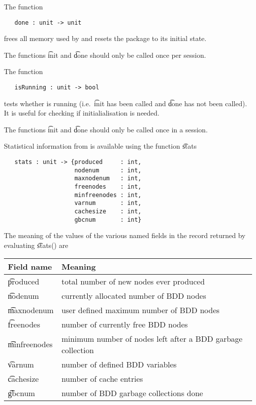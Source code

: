 The function

\begin{verbatim}
   done : unit -> unit
\end{verbatim}

frees all memory used by \Buddy{} and resets the
package to its initial state. 

The functions \t{init} and \t{done} should only be called once per session.

The function

\begin{verbatim}
   isRunning : unit -> bool
\end{verbatim}

tests whether
\Buddy{} is running (i.e.~\t{init} has been called and \t{done} has not been called). It is
useful for checking if initialialisation is needed.

The functions \t{init} and \t{done} should only be called once in a session.

Statistical information from \Buddy{} is available
using the function \t{stats}

\begin{verbatim}
   stats : unit -> {produced     : int,
                    nodenum      : int,
                    maxnodenum   : int,
                    freenodes    : int,
                    minfreenodes : int,
                    varnum       : int,
                    cachesize    : int,
                    gbcnum       : int}
\end{verbatim}

The meaning of the values of the various named fields in the record returned by
evaluating \t{stats()} are

\medskip

\begin{tabular}{|l|l|} \hline
{\bf{Field name}}& {\bf{Meaning}}                                              \\ \hline\hline
\t{produced}     & total number of new nodes ever produced                     \\ \hline
\t{nodenum}      & currently allocated number of BDD nodes                     \\ \hline
\t{maxnodenum}   & user defined maximum number of BDD nodes                    \\ \hline
\t{freenodes}    & number of currently free BDD nodes                          \\ \hline
\t{minfreenodes} & minimum number of nodes left after a BDD garbage collection \\ \hline
\t{varnum}       & number of defined BDD variables                             \\ \hline
\t{cachesize}    & number of cache entries                                     \\ \hline
\t{gbcnum}       & number of BDD garbage collections done                      \\ \hline
\end{tabular}

